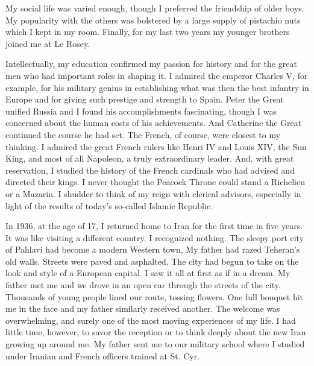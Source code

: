 My social life was varied enough, though I preferred the friendship of older boys. My popularity with the others was bolstered by a large supply of pistachio nuts which I kept in my room. Finally, for my last two years my younger brothers joined me at Le Rosey. 

Intellectually, my education confirmed my passion for history and for the great men who had important roles in shaping it. I admired the emperor Charles V, for example, for his military genius in establishing what was then the best infantry in Europe and for giving such prestige and strength to Spain. Peter the Great unified Russia and I found his accomplishments fascinating, though I was concerned about the human costs of his achievements. And Catherine the Great continued the course he had set. The French, of course, were closest to my thinking. I admired the great French rulers like Henri IV and Louis XIV, the Sun King, and most of all Napoleon, a truly extraordinary leader. And, with great reservation, I studied the history of the French cardinals who had advised and directed their kings. I never thought the Peacock Throne could stand a Richelieu or a Mazarin. I shudder to think of my reign with clerical advisors, especially in light of the results of today's so-called Islamic Republic. 


In 1936, at the age of 17, I returned home to Iran for the first time in five years. It was like visiting a different country. I recognized nothing. The sleepy port city of Pahlavi had become a modern Western town, My father had razed Teheran’s old walls. Streets were paved and asphalted. The city had begun to take on the look and style of a European capital. I saw it all at first as if in a dream. My father met me and we drove in an open car through the streets of the city. Thousands of young people lined our route, tossing flowers. One full bouquet hit me in the face and my father similarly received another. The welcome was overwhelming, and surely one of the most moving experiences of my life. I had little time, however, to savor the reception or to think deeply about the new Iran growing up around me. My father sent me to our military school where I studied under Iranian and French officers trained at St. Cyr. 

